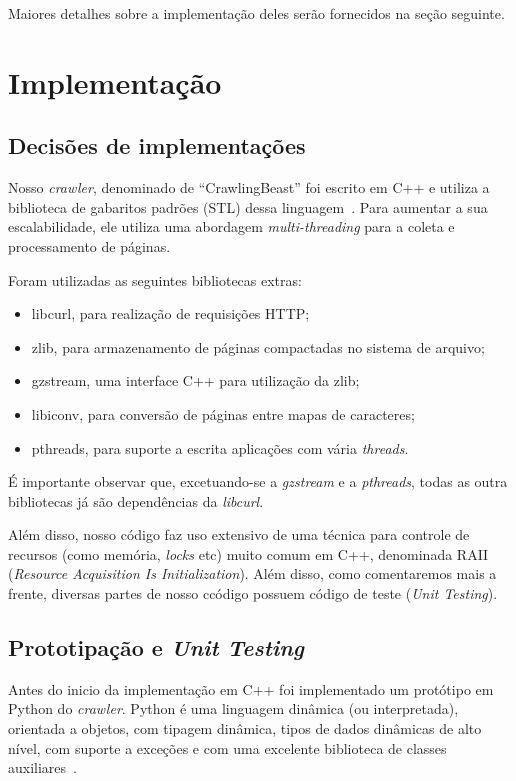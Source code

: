 \documentclass[10pt,twocolumn]{article}
\begin{document}
Maiores detalhes sobre a implementação deles serão fornecidos na seção
seguinte.


\section{Implementação}\label{sec:implementation}

\subsection{Decisões de implementações}

Nosso \emph{crawler}, denominado de ``CrawlingBeast'' foi escrito em C++
e utiliza a biblioteca de gabaritos padrões (STL) dessa
linguagem~\cite{stroustrup97}. Para aumentar a sua escalabilidade, ele
utiliza uma abordagem \emph{multi-threading} para a coleta e
processamento de páginas.

Foram utilizadas as seguintes bibliotecas extras:
\begin{itemize}
\item libcurl, para realização de requisições HTTP;
\item zlib, para armazenamento de páginas compactadas no sistema de
arquivo;
\item gzstream, uma interface C++ para utilização da zlib;
\item libiconv, para conversão de páginas entre mapas de caracteres;
\item pthreads, para suporte a escrita aplicações com vária
\emph{threads}.
\end{itemize}

É importante observar que, excetuando-se a \emph{gzstream} e a
\emph{pthreads}, todas as outra bibliotecas já são dependências da
\emph{libcurl}.

Além disso, nosso código faz uso extensivo de uma técnica para controle
de recursos (como memória, \emph{locks} etc)  muito comum em C++,
denominada RAII (\emph{Resource Acquisition Is Initialization}).
Além disso, como comentaremos mais a frente, diversas partes de nosso
ccódigo possuem código de teste (\emph{Unit Testing}).

\subsection{Prototipação e \emph{Unit Testing}}

Antes do inicio da implementação em C++ foi implementado um protótipo em
Python do \emph{crawler}. Python é uma linguagem dinâmica (ou
interpretada), orientada a objetos, com tipagem dinâmica, tipos de dados
dinâmicas de alto nível, com suporte a exceções e com uma excelente
biblioteca de classes auxiliares~\cite{pythonlang}.
\end{document}
